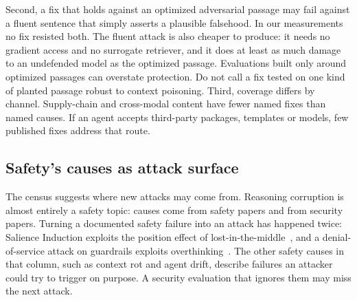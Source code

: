 Second, a fix that holds against an optimized adversarial passage may fail against
a fluent sentence that simply asserts a plausible falsehood. In our
measurements no fix resisted both. The fluent attack is also cheaper to
produce: it needs no gradient access and no surrogate retriever, and it does at
least as much damage to an undefended model as the optimized passage.
Evaluations built only around optimized passages can overstate protection. Do not call a fix tested on one
kind of planted passage robust to context poisoning. Third, coverage differs by channel. Supply-chain and cross-modal content
have fewer named fixes than named causes. If an agent accepts third-party
packages, templates or models, few published fixes address that route.

\subsection{Safety's causes as attack surface}

The census suggests where new attacks may come from. Reasoning corruption is
almost entirely a safety topic: \NReasonSafety{} causes come from safety
papers and \NReasonSec{} from security papers. Turning a documented safety
failure into an attack has happened twice: Salience Induction exploits the
position effect of lost-in-the-middle~\cite{zhou-2026-salience}, and a
denial-of-service attack on guardrails exploits overthinking~\cite{zhou-2026-shield}. The other safety
causes in that column, such as context rot and agent drift, describe failures
an attacker could try to trigger on purpose. A security evaluation that
ignores them may miss the next attack.
